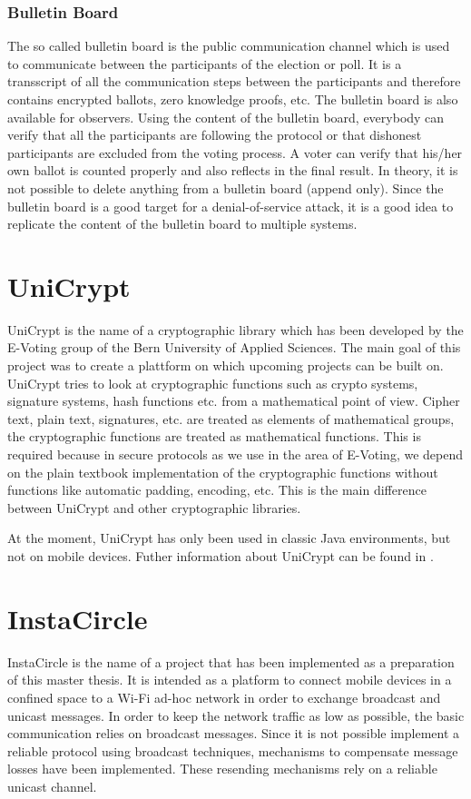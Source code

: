 \documentclass[numbers=noenddot, abstract=on]{scrreprt}
\begin{document}
\subsubsection{Bulletin Board}
\label{sec:bulletinboard}
The so called bulletin board is the
public communication channel which is used to communicate between the
participants of the election or poll. It is a transscript of all the
communication steps between the participants and therefore contains encrypted
ballots, zero knowledge proofs, etc. The bulletin board is also available for
observers. Using the content of the bulletin board, everybody can verify that
all the participants are following the protocol or that dishonest participants
are excluded from the voting process. A voter can verify that his/her own
ballot is counted properly and also reflects in the final result. In theory, it
is not possible to delete anything from a bulletin board (append only). Since
the bulletin board is a good target for a denial-of-service attack, it is a good
idea to replicate the content of the bulletin board to multiple systems.

\section{UniCrypt}
\label{sec:unicrypt}
UniCrypt is the name of a cryptographic library which has been developed by the
E-Voting group of the Bern University of Applied Sciences. The main goal of this
project was to create a plattform on which upcoming projects can be built on.
UniCrypt tries to look at cryptographic functions such as crypto systems,
signature systems, hash functions etc. from a mathematical point of view. Cipher
text, plain text, signatures, etc. are treated as elements of mathematical
groups, the cryptographic functions are treated as mathematical functions. This
is required because in secure protocols as we use in the area of E-Voting, we
depend on the plain textbook implementation of the cryptographic functions
without functions like automatic padding, encoding, etc. This is the main
difference between UniCrypt and other cryptographic libraries.

At the moment, UniCrypt has only been used in classic Java environments, but not
on mobile devices. Futher information about UniCrypt can be found in
\cite{ritter12}.

\section{InstaCircle}
\label{sec:instacircle}
InstaCircle is the name of a project that has been implemented as a preparation
of this master thesis. It is intended as a platform to connect mobile devices
in a confined space to a Wi-Fi ad-hoc network in order to exchange broadcast
and unicast messages. In order to keep the network traffic as low as possible,
the basic communication relies on broadcast messages. Since it is not possible
implement a reliable protocol using broadcast techniques, mechanisms to
compensate message losses have been implemented. These resending mechanisms rely
on a reliable unicast channel.
\end{document}
